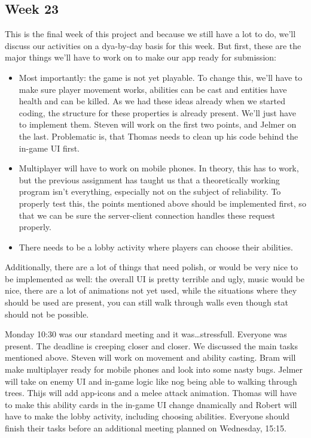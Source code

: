 \documentclass[../main.tex]{subfiles}
\begin{document}
\subsection*{Week 23}
This is the final week of this project and because we still have a lot to do, we'll discuss our activities on a dya-by-day basis for this week. But first, these are the major things we'll have to work on to make our app ready for submission:
\begin{itemize}
	\item Most importantly: the game is not yet playable. To change this, we'll have to make sure player movement works, abilities can be cast and entities have health and can be killed. As we had these ideas already when we started coding, the structure for these properties is already present. We'll just have to implement them. Steven will work on the first two points, and Jelmer on the last. Problematic is, that Thomas needs to clean up his code behind the in-game UI first.
	\item Multiplayer will have to work on mobile phones. In theory, this has to work, but the previous assignment has taught us that a theoretically working program isn't everything, especially not on the subject of reliability. To properly test this, the points mentioned above should be implemented first, so that we can be sure the server-client connection handles these request properly.
	\item There needs to be a lobby activity where players can choose their abilities.
\end{itemize}
Additionally, there are a lot of things that need polish, or would be very nice to be implemented as well: the overall UI is pretty terrible and ugly, music would be nice, there are a lot of animations not yet used, while the situations where they should be used are present, you can still walk through walls even though stat should not be possible.

Monday 10:30 was our standard meeting and it was\dots stressfull. Everyone was present. The deadline is creeping closer and closer. We discussed the main tasks mentioned above. Steven will work on movement and ability casting. Bram will make multiplayer ready for mobile phones and look into some nasty bugs. Jelmer will take on enemy UI and in-game logic like nog being able to walking through trees. Thijs will add app-icons and a melee attack animation. Thomas will have to make this ability cards in the in-game UI change dnamically and Robert will have to make the lobby activity, including choosing abilities. Everyone should finish their tasks before an additional meeting planned on Wednesday, 15:15.
\end{document}
